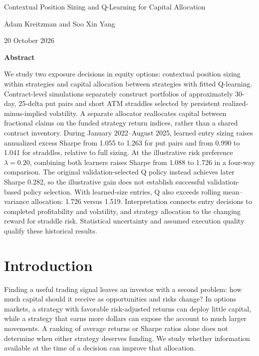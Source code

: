 \documentclass[11pt,letterpaper]{article}
\begin{document}
\begin{center}
\vspace{0.6em}

{\fontsize{11}{14}\selectfont Contextual Position Sizing and Q-Learning for Capital Allocation}\par
\vspace{1em}
Adam Kreitzman and Soo Xin Yang\par
{\small 20 October 2026}
\end{center}
\begin{center}
\begin{minipage}{0.88\textwidth}
\small
\begin{center}\bfseries Abstract\end{center}
\setcounter{secnumdepth}{3}
\setlength{\parindent}{0pt}\noindent
We study two exposure decisions in equity options: contextual position sizing within strategies and capital allocation between strategies with fitted Q-learning. Contract-level simulations separately construct portfolios of approximately 30-day, 25-delta put pairs and short ATM straddles selected by persistent realized-minus-implied volatility. A separate allocator reallocates capital between fractional claims on the funded strategy return indices, rather than a shared contract inventory. During January 2022--August 2025, learned entry sizing raises annualized excess Sharpe from 1.055 to 1.263 for put pairs and from 0.990 to 1.041 for straddles, relative to full sizing. At the illustrative risk preference \(\lambda=0.20\), combining both learners raises Sharpe from 1.088 to 1.726 in a four-way comparison. The original validation-selected Q policy instead achieves later Sharpe 0.282, so the illustrative gain does not establish successful validation-based policy selection. With learned-size entries, Q also exceeds rolling mean--variance allocation: 1.726 versus 1.519. Interpretation connects entry decisions to completed profitability and volatility, and strategy allocation to the changing reward for straddle risk. Statistical uncertainty and assumed execution quality qualify these historical results.
\end{minipage}
\end{center}
\section{Introduction}\label{sec:1}
Finding a useful trading signal leaves an investor with a second problem: how much capital should it receive as opportunities and risks change? In options markets, a strategy with favorable risk-adjusted returns can deploy little capital, while a strategy that earns more dollars can expose the account to much larger movements. A ranking of average returns or Sharpe ratios alone does not determine when either strategy deserves funding. We study whether information available at the time of a decision can improve that allocation.
\end{document}
